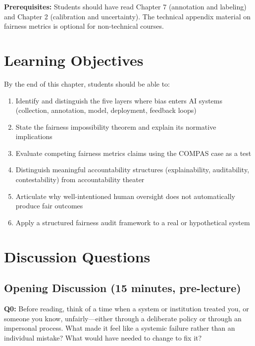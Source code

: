 \textbf{Prerequisites:} Students should have read Chapter 7 (annotation and labeling) and Chapter 2 (calibration and uncertainty). The technical appendix material on fairness metrics is optional for non-technical courses.

\section*{Learning Objectives}

By the end of this chapter, students should be able to:

\begin{enumerate}
    \item Identify and distinguish the five layers where bias enters AI systems (collection, annotation, model, deployment, feedback loops)
    \item State the fairness impossibility theorem and explain its normative implications
    \item Evaluate competing fairness metrics claims using the COMPAS case as a test
    \item Distinguish meaningful accountability structures (explainability, auditability, contestability) from accountability theater
    \item Articulate why well-intentioned human oversight does not automatically produce fair outcomes
    \item Apply a structured fairness audit framework to a real or hypothetical system
\end{enumerate}

\section*{Discussion Questions}

\subsection*{Opening Discussion (15 minutes, pre-lecture)}

\textbf{Q0:} Before reading, think of a time when a system or institution treated you, or someone you know, unfairly---either through a deliberate policy or through an impersonal process. What made it feel like a systemic failure rather than an individual mistake? What would have needed to change to fix it?

